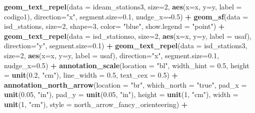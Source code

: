 \documentclass[12pt,oneside]{reedthesis}
\newenvironment{Shaded}{\begin{snugshade}}{\end{snugshade}}
\newcommand{\DataTypeTok}[1]{\textcolor[rgb]{0.13,0.29,0.53}{#1}}
\newcommand{\DecValTok}[1]{\textcolor[rgb]{0.00,0.00,0.81}{#1}}
\newcommand{\FloatTok}[1]{\textcolor[rgb]{0.00,0.00,0.81}{#1}}
\newcommand{\KeywordTok}[1]{\textcolor[rgb]{0.13,0.29,0.53}{\textbf{#1}}}
\newcommand{\NormalTok}[1]{#1}
\newcommand{\OperatorTok}[1]{\textcolor[rgb]{0.81,0.36,0.00}{\textbf{#1}}}
\newcommand{\StringTok}[1]{\textcolor[rgb]{0.31,0.60,0.02}{#1}}
\begin{document}
\begin{Shaded}
\begin{Highlighting}[]
{{{{\StringTok{  }\KeywordTok{geom_text_repel}\NormalTok{(}\DataTypeTok{data =}\NormalTok{ ideam_stations3, }\DataTypeTok{size=}\DecValTok{2}\NormalTok{, }\KeywordTok{aes}\NormalTok{(}\DataTypeTok{x=}\NormalTok{x, }\DataTypeTok{y=}\NormalTok{y, }\DataTypeTok{label =}\NormalTok{ codigo1), }\DataTypeTok{direction=}\StringTok{"x"}\NormalTok{, }\DataTypeTok{segment.size=}\FloatTok{0.1}\NormalTok{, }\DataTypeTok{nudge_x=}\OperatorTok{-}\FloatTok{0.5}\NormalTok{) }\OperatorTok{+}
\StringTok{  }\KeywordTok{geom_sf}\NormalTok{(}\DataTypeTok{data =}\NormalTok{ isd_stations, }\DataTypeTok{size=}\DecValTok{2}\NormalTok{, }\DataTypeTok{shape=}\DecValTok{3}\NormalTok{, }\DataTypeTok{color=} \StringTok{"blue"}\NormalTok{, }\DataTypeTok{show.legend =} \StringTok{"point"}\NormalTok{) }\OperatorTok{+}
\StringTok{  }\KeywordTok{geom_text_repel}\NormalTok{(}\DataTypeTok{data =}\NormalTok{ isd_stationso, }\DataTypeTok{size=}\DecValTok{2}\NormalTok{, }\KeywordTok{aes}\NormalTok{(}\DataTypeTok{x=}\NormalTok{x, }\DataTypeTok{y=}\NormalTok{y, }\DataTypeTok{label =}\NormalTok{ usaf), }\DataTypeTok{direction=}\StringTok{"y"}\NormalTok{, }\DataTypeTok{segment.size=}\FloatTok{0.1}\NormalTok{) }\OperatorTok{+}
\StringTok{  }\KeywordTok{geom_text_repel}\NormalTok{(}\DataTypeTok{data =}\NormalTok{ isd_stations3, }\DataTypeTok{size=}\DecValTok{2}\NormalTok{, }\KeywordTok{aes}\NormalTok{(}\DataTypeTok{x=}\NormalTok{x, }\DataTypeTok{y=}\NormalTok{y, }\DataTypeTok{label =}\NormalTok{ usaf), }\DataTypeTok{direction=}\StringTok{"x"}\NormalTok{, }\DataTypeTok{segment.size=}\FloatTok{0.1}\NormalTok{, }\DataTypeTok{nudge_x=}\FloatTok{0.5}\NormalTok{) }\OperatorTok{+}
\StringTok{  }\KeywordTok{annotation_scale}\NormalTok{(}\DataTypeTok{location =} \StringTok{"bl"}\NormalTok{, }\DataTypeTok{width_hint =} \FloatTok{0.5}\NormalTok{, }\DataTypeTok{height =} \KeywordTok{unit}\NormalTok{(}\FloatTok{0.2}\NormalTok{, }\StringTok{"cm"}\NormalTok{), }\DataTypeTok{line_width =} \FloatTok{0.5}\NormalTok{, }\DataTypeTok{text_cex =} \FloatTok{0.5}\NormalTok{) }\OperatorTok{+}\StringTok{ }
\StringTok{  }\KeywordTok{annotation_north_arrow}\NormalTok{(}\DataTypeTok{location =} \StringTok{"br"}\NormalTok{, }\DataTypeTok{which_north =} \StringTok{"true"}\NormalTok{, }\DataTypeTok{pad_x =} \KeywordTok{unit}\NormalTok{(}\FloatTok{0.05}\NormalTok{, }\StringTok{"in"}\NormalTok{), }\DataTypeTok{pad_y =} \KeywordTok{unit}\NormalTok{(}\FloatTok{0.05}\NormalTok{, }\StringTok{"in"}\NormalTok{), }\DataTypeTok{height =} \KeywordTok{unit}\NormalTok{(}\DecValTok{1}\NormalTok{, }\StringTok{"cm"}\NormalTok{), }
   \DataTypeTok{width =} \KeywordTok{unit}\NormalTok{(}\DecValTok{1}\NormalTok{, }\StringTok{"cm"}\NormalTok{), }\DataTypeTok{style =}\NormalTok{ north_arrow_fancy_orienteering) }\OperatorTok{+}
}}}}
\end{Highlighting}
\end{Shaded}
\end{document}
